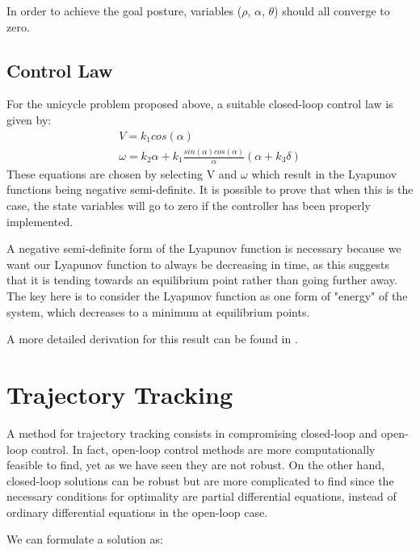 \documentclass[twoside]{article}
\begin{document}
In order to achieve the goal posture, variables ($\rho$, $\alpha$, $\theta$) should all converge to zero.

\pagebreak
\subsection{Control Law}

For the unicycle problem proposed above, a suitable closed-loop control law is given by:
\begin{equation}
\begin{split}
V=k_1 cos(\alpha)
\\
\omega=k_2 \alpha + k_1 \frac{sin(\alpha)cos(\alpha)}{\alpha}(\alpha + k_3 \delta)
\end{split}
\end{equation}
These equations are chosen by selecting V and $\omega$ which result in the Lyapunov functions being negative semi-definite. It is possible to prove that when this is the case, the state variables will go to zero if the controller has been properly implemented.

A negative semi-definite form of the Lyapunov function is necessary because we want our Lyapunov function to always be decreasing in time, as this suggests that it is tending towards an equilibrium point rather than going further away. The key here is to consider the Lyapunov function as one form of "energy" of the system, which decreases to a minimum at equilibrium points.

A more detailed derivation for this result can be found in \cite{lyupanov}.


\section{Trajectory Tracking}
A method for trajectory tracking consists in compromising closed-loop and open-loop control. In fact, open-loop control methods are more computationally feasible to find, yet as we have seen they are not robust. On the other hand, closed-loop solutions can be robust but are more complicated to find since the necessary conditions for optimality are partial differential equations, instead of ordinary differential equations in the open-loop case.

We can formulate a solution as:
\end{document}
